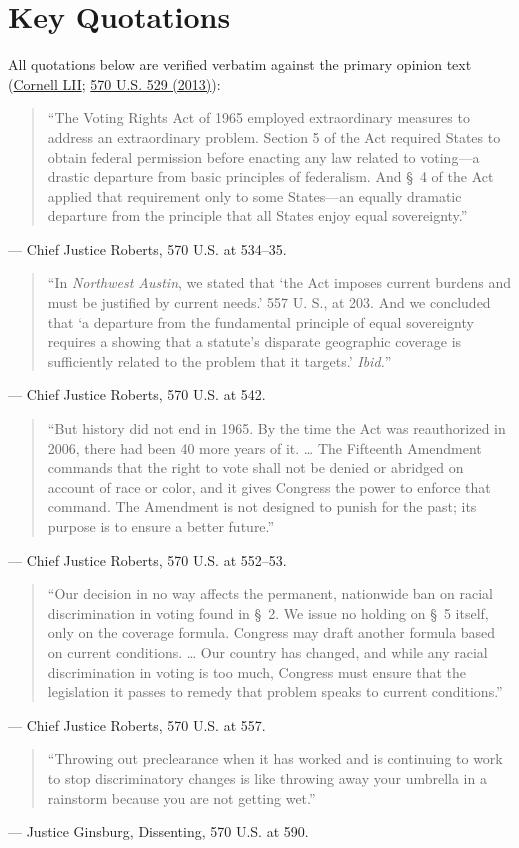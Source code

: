 \documentclass[12pt]{article}
\begin{document}
\section{Key Quotations}
All quotations below are verified verbatim against the primary opinion text (\href{https://www.law.cornell.edu/supremecourt/text/12-96}{Cornell LII}; \href{https://tile.loc.gov/storage-services/service/ll/usrep/usrep570/usrep570529/usrep570529.pdf}{570 U.S. 529 (2013)}):

\begin{quote}
``The Voting Rights Act of 1965 employed extraordinary measures to address an extraordinary problem. Section 5 of the Act required States to obtain federal permission before enacting any law related to voting---a drastic departure from basic principles of federalism. And \S~4 of the Act applied that requirement only to some States---an equally dramatic departure from the principle that all States enjoy equal sovereignty.''
\end{quote}
\noindent --- Chief Justice Roberts, 570 U.S. at 534--35.

\begin{quote}
``In \emph{Northwest Austin}, we stated that `the Act imposes current burdens and must be justified by current needs.' 557 U. S., at 203. And we concluded that `a departure from the fundamental principle of equal sovereignty requires a showing that a statute's disparate geographic coverage is sufficiently related to the problem that it targets.' \emph{Ibid.}''
\end{quote}
\noindent --- Chief Justice Roberts, 570 U.S. at 542.

\begin{quote}
``But history did not end in 1965. By the time the Act was reauthorized in 2006, there had been 40 more years of it. \ldots{} The Fifteenth Amendment commands that the right to vote shall not be denied or abridged on account of race or color, and it gives Congress the power to enforce that command. The Amendment is not designed to punish for the past; its purpose is to ensure a better future.''
\end{quote}
\noindent --- Chief Justice Roberts, 570 U.S. at 552--53.

\begin{quote}
``Our decision in no way affects the permanent, nationwide ban on racial discrimination in voting found in \S~2. We issue no holding on \S~5 itself, only on the coverage formula. Congress may draft another formula based on current conditions. \ldots{} Our country has changed, and while any racial discrimination in voting is too much, Congress must ensure that the legislation it passes to remedy that problem speaks to current conditions.''
\end{quote}
\noindent --- Chief Justice Roberts, 570 U.S. at 557.

\begin{quote}
``Throwing out preclearance when it has worked and is continuing to work to stop discriminatory changes is like throwing away your umbrella in a rainstorm because you are not getting wet.''
\end{quote}
\noindent --- Justice Ginsburg, Dissenting, 570 U.S. at 590.
\end{document}
